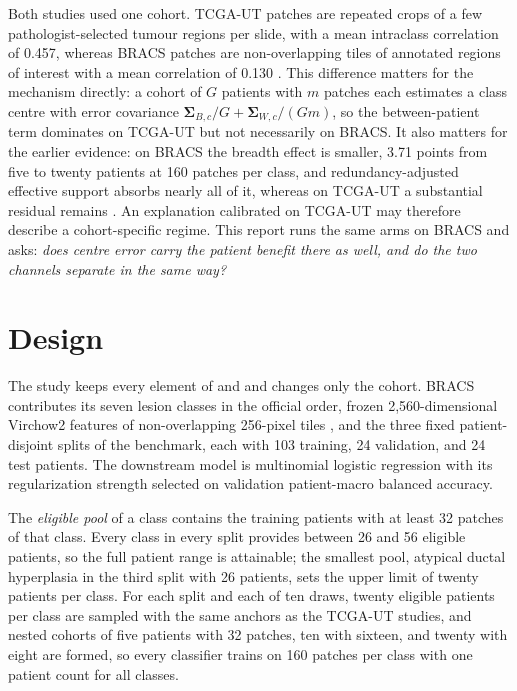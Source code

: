 \documentclass[11pt]{article}
\begin{document}
Both studies used one cohort. TCGA-UT patches are repeated crops of a few pathologist-selected tumour regions per slide, with a mean intraclass correlation of 0.457, whereas BRACS patches are non-overlapping tiles of annotated regions of interest with a mean correlation of 0.130 \citep{queisler2026effectiveSupport}. This difference matters for the mechanism directly: a cohort of $G$ patients with $m$ patches each estimates a class centre with error covariance $\boldsymbol\Sigma_{B,c}/G+\boldsymbol\Sigma_{W,c}/(Gm)$, so the between-patient term dominates on TCGA-UT but not necessarily on BRACS. It also matters for the earlier evidence: on BRACS the breadth effect is smaller, 3.71 points from five to twenty patients at 160 patches per class, and redundancy-adjusted effective support absorbs nearly all of it, whereas on TCGA-UT a substantial residual remains \citep{queisler2026effectiveSupport,queisler2026multidirectionalRedundancy}. An explanation calibrated on TCGA-UT may therefore describe a cohort-specific regime. This report runs the same arms on BRACS and asks: \emph{does centre error carry the patient benefit there as well, and do the two channels separate in the same way?}

\section{Design}
\label{sec:design}
The study keeps every element of \citet{queisler2026centreError} and \citet{queisler2026patientDirections} and changes only the cohort. BRACS contributes its seven lesion classes in the official order, frozen 2,560-dimensional Virchow2 features of non-overlapping 256-pixel tiles \citep{zimmermann2024virchow2}, and the three fixed patient-disjoint splits of the benchmark, each with 103 training, 24 validation, and 24 test patients. The downstream model is multinomial logistic regression with its regularization strength selected on validation patient-macro balanced accuracy.

The \emph{eligible pool} of a class contains the training patients with at least 32 patches of that class. Every class in every split provides between 26 and 56 eligible patients, so the full patient range is attainable; the smallest pool, atypical ductal hyperplasia in the third split with 26 patients, sets the upper limit of twenty patients per class. For each split and each of ten draws, twenty eligible patients per class are sampled with the same anchors as the TCGA-UT studies, and nested cohorts of five patients with 32 patches, ten with sixteen, and twenty with eight are formed, so every classifier trains on 160 patches per class with one patient count for all classes.
\end{document}
